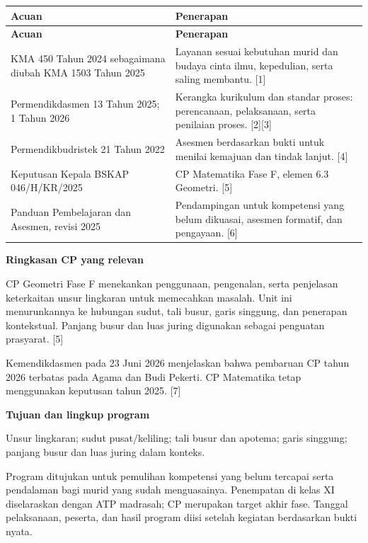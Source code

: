 \documentclass[11pt,a4paper]{article}
\begin{document}
{\small\setlength{\tabcolsep}{2mm}\renewcommand{\arraystretch}{1.35}\begin{longtable}{|>{\raggedright\arraybackslash}p{60.554mm}|>{\raggedright\arraybackslash}p{108.996mm}|}\hline
\rowcolor{gray!10}\textbf{Acuan} & \textbf{Penerapan}\\ \hline
\endfirsthead
\rowcolor{gray!10}\textbf{Acuan} & \textbf{Penerapan}\\ \hline
\endhead
KMA 450 Tahun 2024 sebagaimana diubah KMA 1503 Tahun 2025 & Layanan sesuai kebutuhan murid dan budaya cinta ilmu, kepedulian, serta saling membantu. [1]\\ \hline
Permendikdasmen 13 Tahun 2025; 1 Tahun 2026 & Kerangka kurikulum dan standar proses: perencanaan, pelaksanaan, serta penilaian proses. [2][3]\\ \hline
Permendikbudristek 21 Tahun 2022 & Asesmen berdasarkan bukti untuk menilai kemajuan dan tindak lanjut. [4]\\ \hline
Keputusan Kepala BSKAP 046/H/KR/2025 & CP Matematika Fase F, elemen 6.3 Geometri. [5]\\ \hline
Panduan Pembelajaran dan Asesmen, revisi 2025 & Pendampingan untuk kompetensi yang belum dikuasai, asesmen formatif, dan pengayaan. [6]\\ \hline
\end{longtable}}\medskip
\par\medskip\noindent\textbf{Ringkasan CP yang relevan}\par\smallskip
CP Geometri Fase F menekankan penggunaan, pengenalan, serta penjelasan keterkaitan unsur lingkaran untuk memecahkan masalah. Unit ini menurunkannya ke hubungan sudut, tali busur, garis singgung, dan penerapan kontekstual. Panjang busur dan luas juring digunakan sebagai penguatan prasyarat. [5]\par\medskip
{\small Kemendikdasmen pada 23 Juni 2026 menjelaskan bahwa pembaruan CP tahun 2026 terbatas pada Agama dan Budi Pekerti. CP Matematika tetap menggunakan keputusan tahun 2025. [7]\par}\medskip
\par\medskip\noindent\textbf{Tujuan dan lingkup program}\par\smallskip
Unsur lingkaran; sudut pusat/keliling; tali busur dan apotema; garis singgung; panjang busur dan luas juring dalam konteks.\par\medskip
{\small Program ditujukan untuk pemulihan kompetensi yang belum tercapai serta pendalaman bagi murid yang sudah menguasainya. Penempatan di kelas XI diselaraskan dengan ATP madrasah; CP merupakan target akhir fase. Tanggal pelaksanaan, peserta, dan hasil program diisi setelah kegiatan berdasarkan bukti nyata.\par}\medskip
\end{document}
